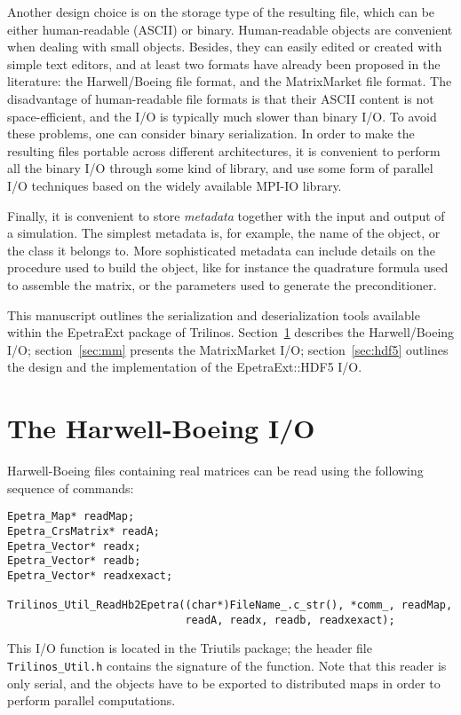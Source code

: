 \documentclass[11pt,relax]{SANDreport}
\begin{document}
Another design choice is  on the storage type of the resulting file, which 
can be either human-readable (ASCII) or binary.
Human-readable objects are convenient when dealing with small objects.
Besides, they can easily edited or created with simple text editors, and at
least two formats have already been proposed in the literature: the
Harwell/Boeing file format, and the MatrixMarket file format. The
disadvantage of human-readable file formats is that their ASCII content is not
space-efficient, and the I/O is typically much slower than binary I/O. To 
avoid these problems,
one can consider binary serialization. In order to make the
resulting files portable across different architectures, it is convenient to
perform all the binary I/O through some kind of library, and use some form of
parallel I/O techniques based on the 
widely available MPI-IO library.

Finally, it is convenient to store {\sl metadata} together with the input and
output of a simulation. The simplest metadata is, for example, the name of the
object, or the class it belongs to. More sophisticated metadata can include 
details on the procedure used to build the object, like for instance the
quadrature formula used to assemble the matrix, or the parameters used to
generate the preconditioner.

\smallskip

This manuscript outlines the serialization and deserialization tools available
within the EpetraExt package of Trilinos. Section~\ref{sec:hb} describes the
Harwell/Boeing I/O; section~\ref{sec:mm} presents the MatrixMarket I/O;
section~\ref{sec:hdf5} outlines the design and the implementation of the
EpetraExt::HDF5 I/O. 

\section{The Harwell-Boeing I/O}
\label{sec:hb}

Harwell-Boeing files containing real matrices can be read using the following
sequence of commands:
\begin{verbatim}
Epetra_Map* readMap;
Epetra_CrsMatrix* readA; 
Epetra_Vector* readx; 
Epetra_Vector* readb;
Epetra_Vector* readxexact;

Trilinos_Util_ReadHb2Epetra((char*)FileName_.c_str(), *comm_, readMap,
                            readA, readx, readb, readxexact);
\end{verbatim}
This I/O function is located in the Triutils package; the header file
\verb!Trilinos_Util.h! contains the signature of the function. Note that this
reader is only serial, and the objects have to be exported to distributed maps
in order to perform parallel computations.
\end{document}
